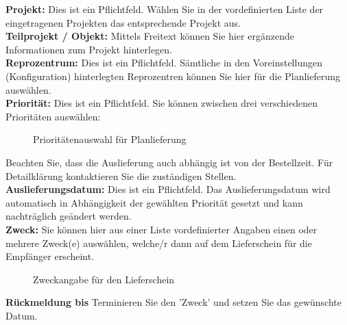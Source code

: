 \textbf{Projekt:} Dies ist ein Pflichtfeld. Wählen Sie in der vordefinierten Liste der eingetragenen Projekten das entsprechende Projekt aus. \\
\textbf{Teilprojekt / Objekt:} Mittels Freitext können Sie hier ergänzende Informationen zum Projekt hinterlegen. \\
\textbf{Reprozentrum:} Dies ist ein Pflichtfeld. Sämtliche in den Voreinstellungen (Konfiguration) hinterlegten Reprozentren können Sie hier für die Planlieferung auswählen. \\
\textbf{Priorität:} Dies ist ein Pflichtfeld. Sie können zwischen drei verschiedenen Prioritäten auswählen:
\begin{figure}[H]
\caption{Prioritätenauswahl für Planlieferung}
\end{figure}
Beachten Sie, dass die Auslieferung auch abhängig ist von der Bestellzeit. Für Detailklärung kontaktieren Sie die zuständigen Stellen. \\
\textbf{Auslieferungsdatum:} Dies ist ein Pflichtfeld. Das Auslieferungsdatum wird automatisch in Abhängigkeit der gewählten Priorität gesetzt und kann nachträglich geändert werden. \\
\textbf{Zweck:} Sie können hier aus einer Liste vordefinierter Angaben einen oder mehrere Zweck(e) auswählen, welche/r dann auf dem Lieferschein für die Empfänger erscheint.
\begin{figure}[H]
\caption{Zweckangabe für den Lieferschein}
\end{figure}
\textbf{Rückmeldung bis} Terminieren Sie den 'Zweck' und setzen Sie das gewünschte Datum. \\
